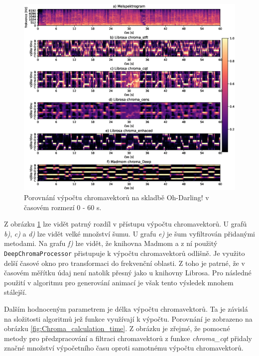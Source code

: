 \begin{figure}[H]
    \centering
    \includegraphics[width = 1\linewidth]{obrazky/Oh-Darling_chroma_analysis_graphs.eps}
    \caption{Porovnání výpočtu chromavektorů na skladbě Oh-Darling! v časovém rozmezí 0 - 60 s.}
    \label{fig:Chroma_analysis}
\end{figure}

Z obrázku \ref{fig:Chroma_analysis} lze vidět patrný rozdíl v přístupu výpočtu chromavektorů. U grafů \textit{b)}, \textit{c)} a \textit{d)} lze vidět velké množství šumu. U grafu \textit{e)} je šum vyfiltrován přidanými metodami. Na grafu \textit{f)} lze vidět, že knihovna Madmom a z ní použitý \texttt{DeepChromaProcessor} přistupuje k výpočtu chromavektorů odlišně. Je využito delší časové okno pro transformaci do frekvenční oblasti. Z toho je patrné, že v časovém měřítku údaj není natolik přesný jako u knihovny Librosa. Pro následné použití v algoritmu pro generování animací je však tento výsledek mnohem stálejší. 

Dalším hodnoceným parametrem je délka výpočtu chromavektorů. Ta je závislá na složitosti algoritmů jež funkce využívají k výpočtu. Porovnání je zobrazeno na obrázku \ref{fig:Chroma_calculation_time}. Z obrázku je zřejmé, že pomocné metody pro předzpracování a filtraci chromavektorů z funkce \textit{chroma\_cqt} přidaly značné množství výpočetního času oproti samotnému výpočtu chromavektorů.

